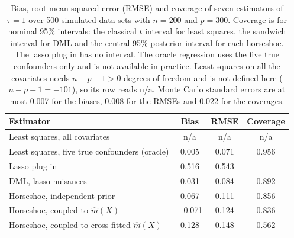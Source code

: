 \begin{table}[ht]
\centering
\small
\caption{Bias, root mean squared error (RMSE) and coverage of seven estimators of $\tau = 1$ over 500 simulated data sets with $n = 200$ and $p = 300$. Coverage is for nominal 95\% intervals: the classical $t$ interval for least squares, the sandwich interval for DML and the central 95\% posterior interval for each horseshoe. The lasso plug in has no interval. The oracle regression uses the five true confounders only and is not available in practice. Least squares on all the covariates needs $n - p - 1 > 0$ degrees of freedom and is not defined here ($n - p - 1 = -101$), so its row reads n/a. Monte Carlo standard errors are at most 0.007 for the biases, 0.008 for the RMSEs and 0.022 for the coverages.}
\label{tab:ric_hd300}
\begin{tabular}{@{}>{\raggedright\arraybackslash}p{2.3in}ccc@{}}
\toprule
Estimator & Bias & RMSE & Coverage \\
\midrule
Least squares, all covariates & n/a & n/a & n/a \\
Least squares, five true confounders (oracle) & 0.005 & 0.071 & 0.956 \\
Lasso plug in & 0.516 & 0.543 &  \\
DML, lasso nuisances & 0.031 & 0.084 & 0.892 \\
Horseshoe, independent prior & 0.067 & 0.111 & 0.856 \\
Horseshoe, coupled to $\hat m(X)$ & $-$0.071 & 0.124 & 0.836 \\
Horseshoe, coupled to cross fitted $\hat m(X)$ & 0.128 & 0.148 & 0.562 \\
\bottomrule
\end{tabular}
\end{table}
